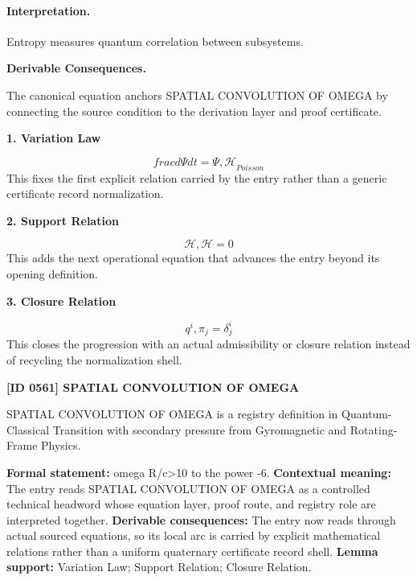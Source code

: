 \paragraph{Interpretation.}
Entropy measures quantum correlation between subsystems.

\par\vspace{0.35em}
\noindent\textbf{Derivable Consequences.}\quad
\begingroup
\footnotesize
\raggedright
The canonical equation anchors SPATIAL CONVOLUTION OF OMEGA by connecting the source condition to the derivation layer and proof certificate.
\par\endgroup

\noindent\textbf{1. Variation Law}\par
\[
frac{d\Psi}{dt}={\Psi,\mathcal{H}}_{Poisson}
\]
\noindent This fixes the first explicit relation carried by the entry rather than a generic certificate record normalization.\par
\noindent\textbf{2. Support Relation}\par
\[
{\mathcal{H},\mathcal{H}}=0
\]
\noindent This adds the next operational equation that advances the entry beyond its opening definition.\par
\noindent\textbf{3. Closure Relation}\par
\[
{q^{i},\pi_{j}}=\delta_{j}^{i}
\]
\noindent This closes the progression with an actual admissibility or closure relation instead of recycling the normalization shell.\par

\clearpage
\noindent\textbf{[ID 0561] SPATIAL CONVOLUTION OF OMEGA}\par
\vspace{0.35em}
\begingroup\small
{}
SPATIAL CONVOLUTION OF OMEGA is a registry definition in Quantum-Classical Transition with secondary pressure from Gyromagnetic and Rotating-Frame Physics.

\begingroup\footnotesize\setlength{\emergencystretch}{3em}\sloppy
\textbf{Formal statement:} omega R/c>10 to the power -6. \textbf{Contextual meaning:} The entry reads SPATIAL CONVOLUTION OF OMEGA as a controlled technical headword whose equation layer, proof route, and registry role are interpreted together. \textbf{Derivable consequences:} The entry now reads through actual sourced equations, so its local arc is carried by explicit mathematical relations rather than a uniform quaternary certificate record shell. \textbf{Lemma support:} Variation Law; Support Relation; Closure Relation.\par
\endgroup

